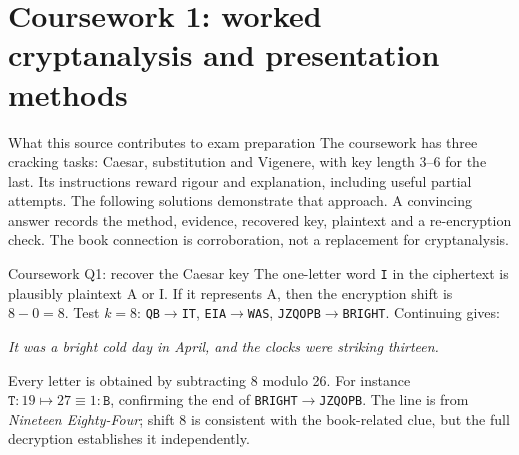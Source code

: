 \documentclass[11pt,a4paper]{article}
\begin{document}
\section{Coursework 1: worked cryptanalysis and presentation methods}
\begin{concept}{What this source contributes to exam preparation}
The coursework has three cracking tasks: Caesar, substitution and Vigenere, with key length 3--6 for the last. Its instructions reward rigour and explanation, including useful partial attempts. The following solutions demonstrate that approach. A convincing answer records the method, evidence, recovered key, plaintext and a re-encryption check. The book connection is corroboration, not a replacement for cryptanalysis.
\end{concept}
\begin{example}{Coursework Q1: recover the Caesar key}
The one-letter word \texttt{I} in the ciphertext is plausibly plaintext A or I. If it represents A, then the encryption shift is \(8-0=8\). Test \(k=8\): \texttt{QB}\(\to\)\texttt{IT}, \texttt{EIA}\(\to\)\texttt{WAS}, \texttt{JZQOPB}\(\to\)\texttt{BRIGHT}. Continuing gives:

\textit{It was a bright cold day in April, and the clocks were striking thirteen.}

Every letter is obtained by subtracting 8 modulo 26. For instance \(\texttt{T}:19\mapsto27\equiv1:\texttt{B}\), confirming the end of \texttt{BRIGHT}\(\to\)\texttt{JZQOPB}. The line is from \emph{Nineteen Eighty-Four}; shift 8 is consistent with the book-related clue, but the full decryption establishes it independently.
\end{example}
\end{document}
